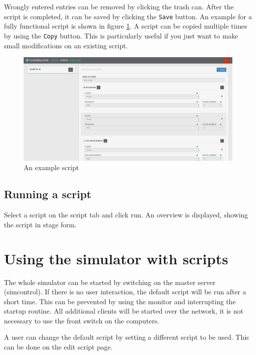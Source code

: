 \documentclass[accentcolor=tud1a, paper=a4, colorback]{tudreport}
\begin{document}
	\\\\
	Wrongly entered entries can be removed by clicking the trash can. After the script is completed,
	it can be saved by clicking the \texttt{Save} button. An example for a fully functional script
	is shown in figure \ref{example_script}. A script can be copied multiple times by using
	the \texttt{Copy} button. This is particularly useful if you just want to make small modifications
	on an existing script.
	\begin{figure}[t]
		\centering
		\includegraphics[width=.9\textwidth]{example_script}
		\caption{An example script}
		\label{example_script}
	\end{figure}

	\section{Running a script}
	Select a script on the script tab and click run. An overview is displayed, showing
	the script in stage form.

	\chapter{Using the simulator with scripts}
	The whole simulator can be started by switching on the master server (simcontrol).
	If there is no user interaction, the default script will be run after a short time.
	This can be prevented by using the monitor and interrupting the startup routine.
	All additional clients will be started over the network, it is not necessary to use the
	front switch on the computers.

	A user can change the default script by setting a different script to be used.
	This can be done on the edit script page.
\end{document}
